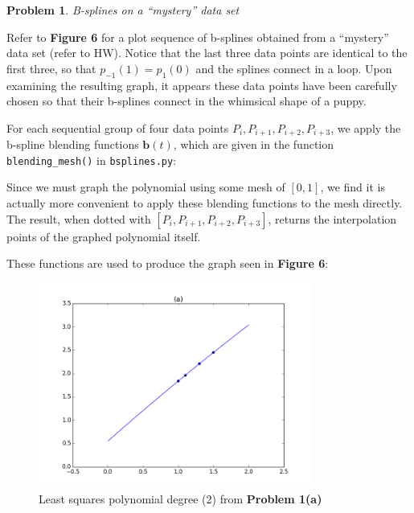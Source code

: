 \documentclass[10pt]{article}
\theoremstyle{plain}
\theoremstyle{definition}
\newtheorem{prob}{Problem}
\numberwithin{equation}{section}
\begin{document}
\begin{prob} \textit{B-splines on a ``mystery'' data set}

    Refer to \textbf{Figure 6} for a plot sequence of b-splines obtained from
    a ``mystery'' data set (refer to HW).
    Notice that the last three data points are identical to the first three,
    so that $p_{-1}(1) = p_1(0)$ and the splines connect in a loop.
    Upon examining the resulting graph, it appears these data points have been
    carefully chosen so that their b-splines connect in the whimsical shape of a
    puppy.

    For each sequential group of four data points $P_{i}, P_{i+1}, P_{i+2}, P_{i+3}$,
    we apply the b-spline blending functions $\bm{b}(t)$,
    which are given in the function \texttt{blending\_mesh()} in \texttt{bsplines.py}:
    
     
    Since we must graph the polynomial using some mesh of $[0,1]$,
    we find it is actually more convenient to apply these blending functions to the mesh directly.
    The result, when dotted with $[P_{i}, P_{i+1}, P_{i+2}, P_{i+3}]$, returns the interpolation points
    of the graphed polynomial itself.

    These functions are used to produce the graph seen in \textbf{Figure 6}:

    

\end{prob}


\begin{figure}[p]
    \begin{center}
        \includegraphics[width=0.8\textwidth]{p1_2}
        \caption{Least squares polynomial degree (2) from \textbf{Problem 1(a)}}
    \end{center}
\end{figure}
\end{document}

